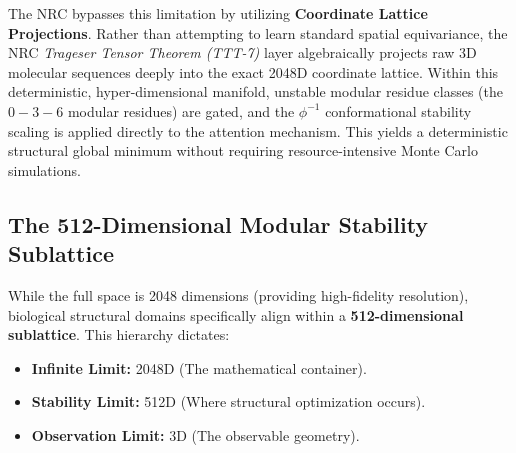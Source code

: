 The NRC bypasses this limitation by utilizing \textbf{Coordinate Lattice Projections}. Rather than attempting to learn standard spatial equivariance, the NRC \textit{Trageser Tensor Theorem (TTT-7)} layer algebraically projects raw 3D molecular sequences deeply into the exact 2048D coordinate lattice. Within this deterministic, hyper-dimensional manifold, unstable modular residue classes (the $0-3-6$ modular residues) are gated, and the $\phi^{-1}$ conformational stability scaling is applied directly to the attention mechanism. This yields a deterministic structural global minimum without requiring resource-intensive Monte Carlo simulations.

\subsection{The 512-Dimensional Modular Stability Sublattice}
While the full space is 2048 dimensions (providing high-fidelity resolution), biological structural domains specifically align within a \textbf{512-dimensional sublattice}. This hierarchy dictates:
\begin{itemize}
	\item \textbf{Infinite Limit:} 2048D (The mathematical container).
	\item \textbf{Stability Limit:} 512D (Where structural optimization occurs).
	\item \textbf{Observation Limit:} 3D (The observable geometry).
\end{itemize}
